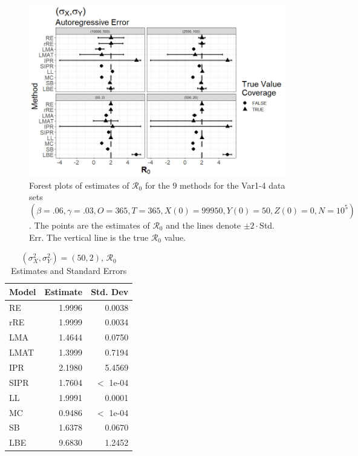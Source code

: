 \documentclass[12pt]{article}
\newcommand{\xxsir}{\ensuremath{9} } %
\newcommand{\rr}{\ensuremath{\mathcal{R}_0}}
\begin{document}
\begin{figure}[H]
	\begin{center}
		\includegraphics[scale=0.5]{images/var_ar.jpg}
		\caption{Forest plots of estimates of $\rr$ for the \xxsir methods for the Var1-4 data sets $(\beta=.06, \gamma=.03, O=365, T=365, X(0)=99950, Y(0)=50, Z(0)=0, N=10^5)$.  The points are the estimates of $\rr$ and the lines denote $\pm 2\cdot $Std. Err.  The vertical line is the true $\rr$ value.}
	\end{center}
\end{figure}

\begin{table}[H]
	
	
	\centering
	\begin{tabular}[t]{l|r|r}
		\hline
		Model & Estimate & Std. Dev\\
		\hline
		RE & 1.9996 & 0.0038\\
		\hline
		rRE & 1.9999 & 0.0034\\
		\hline
		LMA & 1.4644 & 0.0750\\
		\hline
		LMAT & 1.3999 & 0.7194\\
		\hline
		IPR & 2.1980 & 5.4569\\
		\hline
		SIPR & 1.7604 & $<$ 1e-04\\
		\hline
		LL & 1.9991 & 0.0001\\
		\hline
		MC & 0.9486 & $<$ 1e-04\\
		\hline
		SB & 1.6378 & 0.0670\\
		\hline
		LBE & 9.6830 & 1.2452\\
		\hline
	\end{tabular}
	\caption{ $(\sigma^2_X, \sigma^2_Y) = (50, 2)$, $\rr$ Estimates and Standard Errors}
\end{table}
\end{document}

